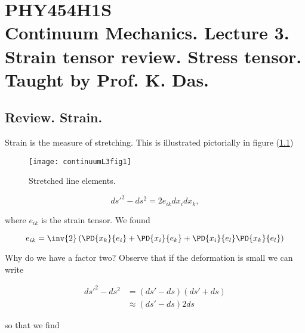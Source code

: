 %
%

\chapter{PHY454H1S\\Continuum Mechanics.  Lecture 3.  Strain tensor review.  Stress tensor.  Taught by Prof. K. Das.}
\label{chap:continuumL3}
{}
\date{Jan 18, 2012}

\beginArtWithToc

%
%
\section{Review.  Strain.}

Strain is the measure of stretching.  This is illustrated pictorially in figure (\ref{fig:continuumL3:continuumL3fig1})
\begin{figure}[htp]
   \centering
   \texttt{[image: continuumL3fig1]}
   \caption{Stretched line elements.}\label{fig:continuumL3:continuumL3fig1}
\end{figure}

\begin{equation}\label{eqn:continuumL3:10}
{ds'}^2 - ds^2 = 2 e_{ik} dx_i dx_k,
\end{equation}

where $e_{ik}$ is the strain tensor.  We found

\begin{equation}\label{eqn:continuumL3:30}
e_{ik} = \inv{2} \left( 
\PD{x_k}{e_i} 
+\PD{x_i}{e_k} 
+
\PD{x_i}{e_l} 
\PD{x_k}{e_l} 
\right)
\end{equation}

Why do we have a factor two?  Observe that if the deformation is small we can write

\begin{align*}
{ds'}^2 - ds^2 
&= (ds' - ds)(ds' + ds) \\
&\approx
 (ds' - ds) 2 ds
\end{align*}

so that we find 

